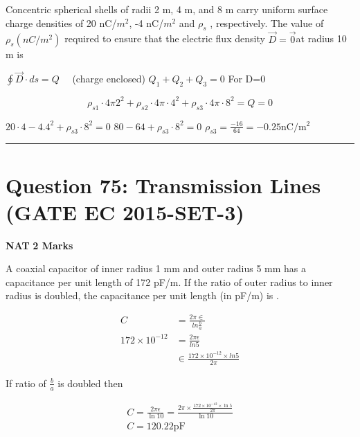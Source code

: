 \documentclass[11pt,a4paper]{article}
\begin{document}
\noindent Concentric spherical shells of radii 2 m, 4 m, and 8 m carry uniform surface charge densities of 20 nC/$m^{2}$, -4 nC/$m^{2}$ and $\rho _{s}$ , respectively. The value of $\rho _{s}  (nC/m^{2})$ required to ensure that the
electric flux density $\overrightarrow{D}=\overrightarrow{0}$at radius 10 m is \underline{\hspace{1.5cm}}


\begin{tcolorbox}[solbox, title=Detailed Solution -- Question 74]
$\oint \vec{D} \cdot ds=Q \quad$ (charge enclosed) 
$Q_{1}+Q_{2}+Q_{3}=0$
 For D=0 

\[
\rho_{s 1} \cdot 4 \pi 2^{2}+\rho_{s 2} \cdot 4 \pi \cdot 4^{2}+\rho_{s 3} \cdot 4 \pi \cdot 8^{2}=Q=0
\]

$20 \cdot 4-4.4^{2}+\rho_{s 3} \cdot 8^{2}=0$
$80-64+\rho_{s 3} \cdot 8^{2}=0$
$\rho_{s 3}=\frac{-16}{64}=-0.25 \mathrm{nC} / \mathrm{m}^{2}$
\end{tcolorbox}

\vspace{1.5em}
\hrule
\vspace{1.5em}

\section*{Question 75: Transmission Lines (GATE EC 2015-SET-3)}
\noindent \textbf{\color{primary}NAT} \hfill \textbf{\color{secondary}2 Marks}


\noindent A coaxial capacitor of inner radius 1 mm and outer radius 5 mm has a capacitance per unit length of 172 pF/m. If the ratio of outer radius to inner radius is doubled, the capacitance per unit length (in pF/m) is \underline{\hspace{1.5cm}}.


\begin{tcolorbox}[solbox, title=Detailed Solution -- Question 75]
\[
\begin{aligned} C &=\frac{2 \pi \in}{ln \frac{b}{a}} \\ 172 \times 10^{-12} &=\frac{2 \pi \epsilon}{ln 5} \\ & \in \frac{172 \times 10^{-12} \times ln 5}{2 \pi} \end{aligned}
\]

 If ratio of $\frac{b}{a}$ is doubled then

\[
\begin{array}{l} C=\frac{2 \pi \epsilon}{\ln 10}=\frac{2 \pi \times \frac{172 \times 10^{-12} \times \ln 5}{2 \pi}}{\ln 10} \\ C=120.22 \mathrm{pF} \end{array}
\]
\end{tcolorbox}
\end{document}
